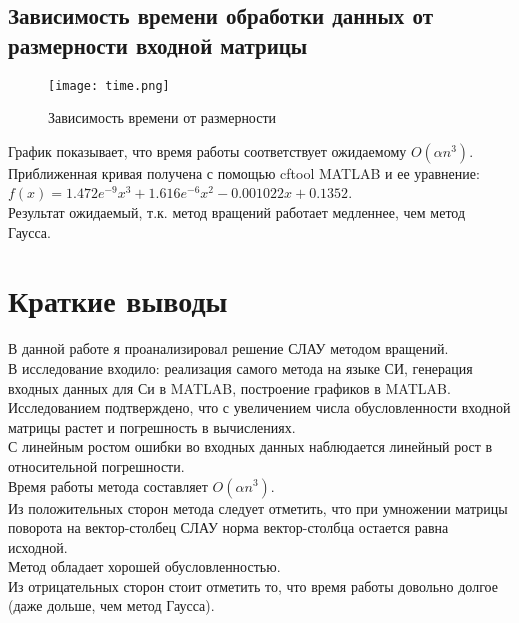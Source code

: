 \documentclass[12pt]{article}
\begin{document}
\subsection{Зависимость времени обработки данных от размерности входной матрицы}
\begin{figure}[h!]
\center
\texttt{[image: time.png]}
\caption{Зависимость времени от размерности}
\label{error_errorData}
\end{figure}
График показывает, что время работы соответствует ожидаемому $O(\alpha n^3)$. Приближенная кривая получена с помощью cftool MATLAB и ее уравнение:\\ $f(x) = 1.472e^{-9}x^3+1.616e^{-6}x^{2} -0.001022x +0.1352$. \\Результат ожидаемый, т.к. метод вращений работает медленнее, чем метод Гаусса.
\newpage
\section{Краткие выводы}
В данной работе я проанализировал решение СЛАУ методом вращений.\\
В исследование входило: реализация самого метода на языке СИ, генерация входных данных для Си в MATLAB, построение графиков в MATLAB.\\
Исследованием подтверждено, что с увеличением числа обусловленности входной матрицы растет и погрешность в вычислениях.\\
С линейным ростом ошибки во входных данных наблюдается линейный рост в относительной погрешности.\\ 
Время работы метода составляет $O(\alpha n^3)$.\\
Из положительных сторон метода следует отметить, что при умножении матрицы поворота на вектор-столбец СЛАУ норма вектор-столбца остается равна исходной.\\
Метод обладает хорошей обусловленностью.\\
Из отрицательных сторон стоит отметить то, что время работы довольно долгое (даже дольше, чем метод Гаусса).\\
\end{document}
